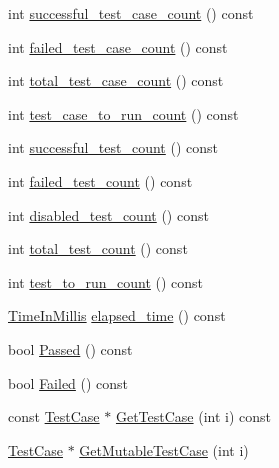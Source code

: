 \begin{DoxyCompactItemize}
\item 
int \hyperlink{classtesting_1_1internal_1_1UnitTestImpl_a846de5ff509b207bca6a55237d035a1f}{successful\-\_\-test\-\_\-case\-\_\-count} () const 
\item 
int \hyperlink{classtesting_1_1internal_1_1UnitTestImpl_a48f76adebf95bff36f0026f0a66c7057}{failed\-\_\-test\-\_\-case\-\_\-count} () const 
\item 
int \hyperlink{classtesting_1_1internal_1_1UnitTestImpl_aba8c18261c58f301e1e80049a0781d84}{total\-\_\-test\-\_\-case\-\_\-count} () const 
\item 
int \hyperlink{classtesting_1_1internal_1_1UnitTestImpl_adf212bae576e88dfb77bd114f01bc117}{test\-\_\-case\-\_\-to\-\_\-run\-\_\-count} () const 
\item 
int \hyperlink{classtesting_1_1internal_1_1UnitTestImpl_ab955f67bc1fe8ef62a7e72906ccece2a}{successful\-\_\-test\-\_\-count} () const 
\item 
int \hyperlink{classtesting_1_1internal_1_1UnitTestImpl_afd8bbd35c7ee99960abb321cfdff3119}{failed\-\_\-test\-\_\-count} () const 
\item 
int \hyperlink{classtesting_1_1internal_1_1UnitTestImpl_a10ec677118627074973fc20c9271b204}{disabled\-\_\-test\-\_\-count} () const 
\item 
int \hyperlink{classtesting_1_1internal_1_1UnitTestImpl_a0eb7286957aeb126d9926c33407a15a3}{total\-\_\-test\-\_\-count} () const 
\item 
int \hyperlink{classtesting_1_1internal_1_1UnitTestImpl_aa6eccf86072f4f8ddd0bea30dfd45912}{test\-\_\-to\-\_\-run\-\_\-count} () const 
\item 
\hyperlink{namespacetesting_1_1internal_a9e0fb32f592d143f031a3431366adae0}{\-Time\-In\-Millis} \hyperlink{classtesting_1_1internal_1_1UnitTestImpl_a4f91886b546ea9cc5ba2d374a62f3a9c}{elapsed\-\_\-time} () const 
\item 
bool \hyperlink{classtesting_1_1internal_1_1UnitTestImpl_ac97d5073365af8a73262fd9f6bf18656}{\-Passed} () const 
\item 
bool \hyperlink{classtesting_1_1internal_1_1UnitTestImpl_a7cf078354304c964c1934f53bf2bb4d7}{\-Failed} () const 
\item 
const \hyperlink{classtesting_1_1TestCase}{\-Test\-Case} $\ast$ \hyperlink{classtesting_1_1internal_1_1UnitTestImpl_adced0a9df4be306d905a3f954fc3eedf}{\-Get\-Test\-Case} (int i) const 
\item 
\hyperlink{classtesting_1_1TestCase}{\-Test\-Case} $\ast$ \hyperlink{classtesting_1_1internal_1_1UnitTestImpl_a04b94a3c825711103b247aa87d6b76e3}{\-Get\-Mutable\-Test\-Case} (int i)

\end{DoxyCompactItemize}
